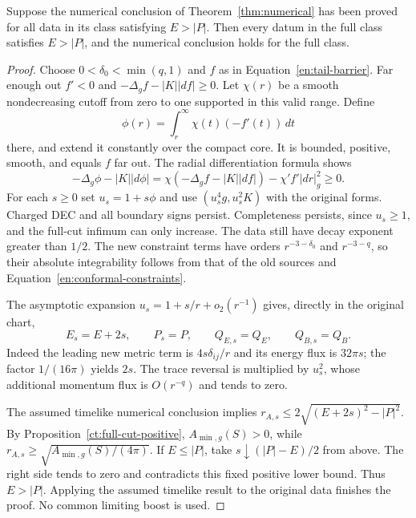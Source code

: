 \begin{lemma}\label{en:timelike-reduction}
Suppose the numerical conclusion of Theorem~\ref{thm:numerical} has
been proved for all data in its class satisfying $E>|P|$.
Then every datum in the full class satisfies $E>|P|$, and the
numerical conclusion holds for the full class.
\end{lemma}

\begin{proof}
Choose $0<\delta_0<\min(q,1)$ and $f$ as in
Equation~\ref{en:tail-barrier}. Far enough out $f'<0$ and
$-\Delta_g f-|K||df|\geq0$. Let $\chi(r)$ be a smooth nondecreasing
cutoff from zero to one supported in this valid range. Define
\[
 \phi(r)=\int_r^\infty\chi(t)(-f'(t))\,dt
\]
there, and extend it constantly over the compact core. It is bounded,
positive, smooth, and equals $f$ far out. The radial differentiation
formula shows
\[
 -\Delta_g\phi-|K||d\phi|
 =\chi(-\Delta_g f-|K||df|)-\chi' f'|dr|_g^2\geq0.
\]
For each $s\geq0$ set $u_s=1+s\phi$ and use
$(u_s^4g,u_s^2K)$ with the original forms. Charged DEC and all
boundary signs persist. Completeness persists, since $u_s\geq1$,
and the full-cut infimum can only increase. The data still have
decay exponent greater than $1/2$. The new constraint terms have
orders $r^{-3-\delta_0}$ and $r^{-3-q}$, so their absolute
integrability follows from that of the old sources and
Equation~\ref{en:conformal-constraints}.

The asymptotic expansion
$u_s=1+s/r+o_2(r^{-1})$ gives, directly in the original chart,
\begin{equation}\label{en:energy-raising}
 E_s=E+2s,\qquad P_s=P,\qquad Q_{E,s}=Q_E,
 \qquad Q_{B,s}=Q_B.
\end{equation}
Indeed the leading new metric term is $4s\delta_{ij}/r$ and its
energy flux is $32\pi s$; the factor $1/(16\pi)$ yields $2s$.
The trace reversal is multiplied by $u_s^2$, whose additional
momentum flux is $O(r^{-q})$ and tends to zero.

The assumed timelike numerical conclusion implies
$r_{A,s}\leq2\sqrt{(E+2s)^2-|P|^2}$. By
Proposition~\ref{ct:full-cut-positive}, $A_{\min,g}(S)>0$, while
$r_{A,s}\geq\sqrt{A_{\min,g}(S)/(4\pi)}$. If $E\leq|P|$,
take $s\downarrow(|P|-E)/2$ from above. The right side tends to
zero and contradicts this fixed positive lower bound. Thus
$E>|P|$. Applying the assumed timelike result to the original
data finishes the proof. No common limiting boost is used.
\end{proof}

